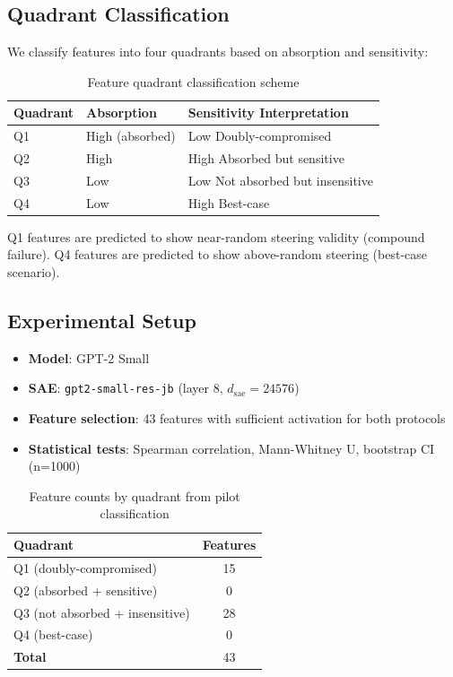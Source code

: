 \documentclass{article}
\begin{document}
\subsection{Quadrant Classification}

We classify features into four quadrants based on absorption and sensitivity:

\begin{table}[htbp]
\caption{Feature quadrant classification scheme}
\label{tab:quadrant-schema}
\centering
\begin{tabular}{lll}
\toprule
Quadrant & Absorption & Sensitivity \hspace{1cm} Interpretation \\
\midrule
Q1 & High (absorbed) & Low \hspace{1cm} Doubly-compromised \\
Q2 & High & High \hspace{1cm} Absorbed but sensitive \\
Q3 & Low & Low \hspace{1cm} Not absorbed but insensitive \\
Q4 & Low & High \hspace{1cm} Best-case \\
\bottomrule
\end{tabular}
\end{table}

Q1 features are predicted to show near-random steering validity (compound failure). Q4 features are predicted to show above-random steering (best-case scenario).

\subsection{Experimental Setup}

\begin{itemize}
  \item \textbf{Model}: GPT-2 Small
  \item \textbf{SAE}: \texttt{gpt2-small-res-jb} (layer 8, $d_{\text{sae}} = 24576$)
  \item \textbf{Feature selection}: 43 features with sufficient activation for both protocols
  \item \textbf{Statistical tests}: Spearman correlation, Mann-Whitney U, bootstrap CI (n=1000)
\end{itemize}

\begin{table}[htbp]
\caption{Feature counts by quadrant from pilot classification}
\label{tab:quadrant-counts}
\centering
\begin{tabular}{lc}
\toprule
Quadrant & Features \\
\midrule
Q1 (doubly-compromised) & 15 \\
Q2 (absorbed + sensitive) & 0 \\
Q3 (not absorbed + insensitive) & 28 \\
Q4 (best-case) & 0 \\
\midrule
\textbf{Total} & 43 \\
\bottomrule
\end{tabular}
\end{table}
\end{document}
